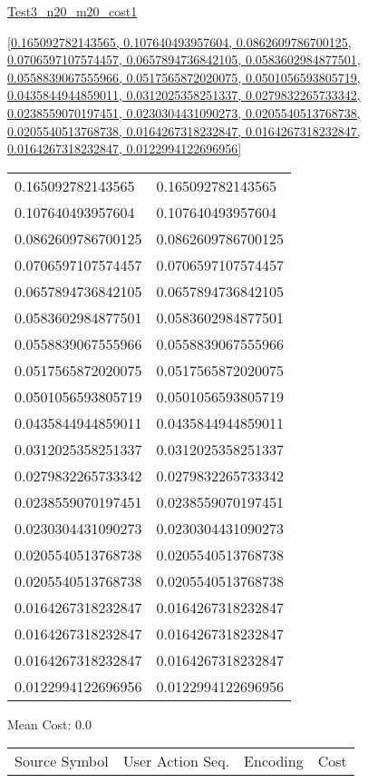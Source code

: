 \documentclass[12pt]{article}
\begin{document}
\noindent \url{Test3_n20_m20_cost1}

\noindent \url{[0.165092782143565, 0.107640493957604, 0.0862609786700125, 0.0706597107574457, 0.0657894736842105, 0.0583602984877501, 0.0558839067555966, 0.0517565872020075, 0.0501056593805719, 0.0435844944859011, 0.0312025358251337, 0.0279832265733342, 0.0238559070197451, 0.0230304431090273, 0.0205540513768738, 0.0205540513768738, 0.0164267318232847, 0.0164267318232847, 0.0164267318232847, 0.0122994122696956]}

\noindent\begin{tt}
\begin{small}
\begin{bundle}{}
\end{bundle}
\end{small}
\end{tt}
\newpage%
\begin{tabular}{l l}0.165092782143565	&	0.165092782143565\\
0.107640493957604	&	0.107640493957604\\
0.0862609786700125	&	0.0862609786700125\\
0.0706597107574457	&	0.0706597107574457\\
0.0657894736842105	&	0.0657894736842105\\
0.0583602984877501	&	0.0583602984877501\\
0.0558839067555966	&	0.0558839067555966\\
0.0517565872020075	&	0.0517565872020075\\
0.0501056593805719	&	0.0501056593805719\\
0.0435844944859011	&	0.0435844944859011\\
0.0312025358251337	&	0.0312025358251337\\
0.0279832265733342	&	0.0279832265733342\\
0.0238559070197451	&	0.0238559070197451\\
0.0230304431090273	&	0.0230304431090273\\
0.0205540513768738	&	0.0205540513768738\\
0.0205540513768738	&	0.0205540513768738\\
0.0164267318232847	&	0.0164267318232847\\
0.0164267318232847	&	0.0164267318232847\\
0.0164267318232847	&	0.0164267318232847\\
0.0122994122696956	&	0.0122994122696956\\
\end{tabular}\newpage
\noindent
\noindent Mean Cost: 0.0\\
\begin{tabular}{l l l l}
Source Symbol	&	User Action Seq.	&	Encoding	&	Cost\\
\end{tabular}
\end{document}
